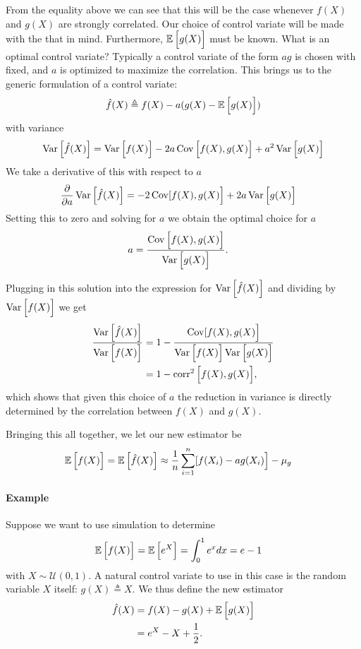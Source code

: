 From the equality above we can see that this will be the case whenever $f(X)$ and $g(X)$ are strongly correlated. Our choice of control variate will be made with the that in mind. Furthermore, $\operatorname{\mathbb{E}} \Big[ g(X) \Big]$ must be known. What is an optimal control variate? Typically a control variate of the form $ag$ is chosen with fixed, and $a$ is optimized to maximize the correlation. This brings us to the generic formulation of a control variate:
\begin{align*}
    \hat{f}(X) \triangleq f(X) - a(g(X) - \operatorname{\mathbb{E}} \Big[ g(X) \Big])
\end{align*}
with variance
\begin{align*}
    \operatorname{Var} \Big[ \hat{f}(X) \Big] &= \operatorname{Var} \Big[ f(X) \Big] - 2a  \operatorname{Cov} \Big[ f(X), g(X) \Big] + a^2 \operatorname{Var} \Big[ g(X) \Big] \\
\end{align*}
We take a derivative of this with respect to $a$
\begin{align*}
    \frac{\partial}{\partial a}\operatorname{Var} \Big[ \hat{f}(X) \Big] &= - 2  \operatorname{Cov} [ f(X), g(X) \Big] + 2a \operatorname{Var} \Big[ g(X) \Big]
\end{align*}
Setting this to zero and solving for $a$ we obtain the optimal choice for $a$
\begin{align}
\label{eq:cv-scale}
    a &= \frac{ \operatorname{Cov} \Big[ f(X), g(X) \Big]}{ \operatorname{Var} \Big[ g(X) \Big]}.
\end{align}

Plugging in this solution into the expression for $\operatorname{Var} \Big[ \hat{f}(X) \Big]$ and dividing by $\operatorname{Var} \Big[ f(X) \Big]$ we get
\begin{align}
\label{eq:var-red}
    \frac{\operatorname{Var} \Big[ \hat{f}(X) \Big]}{\operatorname{Var} \Big[ f(X) \Big]} &= 1 - \frac{\operatorname{Cov}[ f(X), g(X) \Big]}{ \operatorname{Var} \Big[ f(X) \Big]  \operatorname{Var} \Big[ g(X) \Big]} \\
        &= 1 - \operatorname{corr}^2 \Big[ f(X), g(X) \Big],
\end{align}
which shows that given this choice of $a$ the reduction in variance is directly determined by the correlation between $f(X)$ and $g(X)$.

Bringing this all together, we let our new estimator be
\begin{align*}
    \operatorname{\mathbb{E}} \Big[ f(X) \Big] &= \operatorname{\mathbb{E}} \Big[ \hat{f}(X) \Big] \approx \frac{1}{n} \sum_{i=1}^n [ f(X_i) - ag(X_i) \Big] - \mu_{g}
\end{align*}

\paragraph{Example} \citep{Ross:2006:SIM} Suppose we want to use simulation to determine
\begin{align*}
    \operatorname{\mathbb{E}} \Big[f(X)\Big] &= \operatorname{\mathbb{E}} \Big[e^X\Big] = \int_0^1 e^x dx = e - 1
\end{align*}
with $X \sim \mathcal{U}(0,1)$. A natural control variate to use in this case is the random variable $X$ itself: $g(X) \triangleq X$. We thus define the new estimator
\begin{align*}
    \hat{f}(X) &= f(X) - g(X) + \operatorname{\mathbb{E}} \Big[ g(X) \Big] \\
        &= e^X - X + \frac{1}{2}.
\end{align*}

